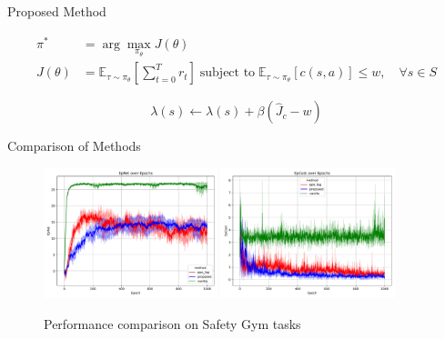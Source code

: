 \documentclass[8pt, aspectratio=169]{beamer} %
\begin{document}
\begin{frame}{\insertsubsectionhead}{Proposed Method}

  \begin{equation}
    \begin{aligned}
      \pi^* &= \arg\max_{\pi_\theta} J(\theta) \\
      J(\theta) &= \mathbb{E}_{\tau \sim \pi_\theta} \left[ \sum^T_{t = 0} r_t \right] \; \text{subject to} \; \mathbb{E}_{\tau \sim \pi_\theta}  [c(s, a)] \leq w, \quad \forall s \in S
    \end{aligned}
  \end{equation}

  \begin{equation}
    \lambda(s) \leftarrow \lambda(s) + \beta(\hat{J}_c - w)
  \end{equation}

  \vspace{0.5cm}


\end{frame}

\begin{frame}{\insertsubsectionhead}{Comparison of Methods}

  {
    \begin{figure}
      \includegraphics[width=0.45\textwidth]{figures/result_reward.pdf}
      \hspace{1cm}
      \includegraphics[width=0.45\textwidth]{figures/result_cost.pdf}
      \caption{Performance comparison on Safety Gym tasks}
    \end{figure}
  }

\end{frame}
\end{document}
